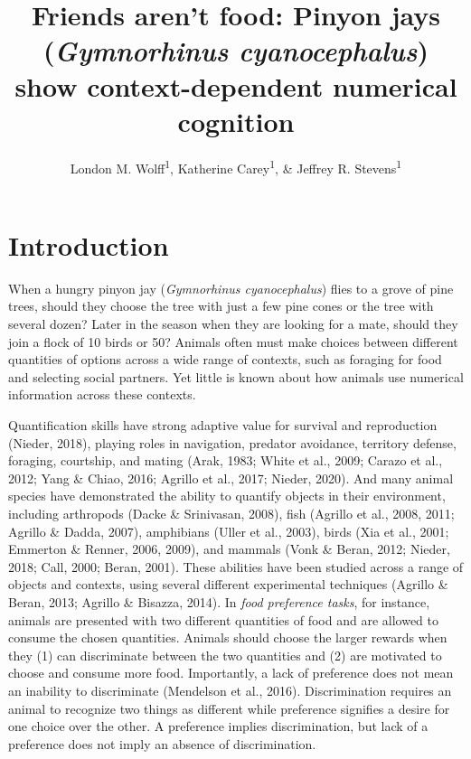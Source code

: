 \documentclass[
  ,pub,floatsintext]{apa6}
\title{Friends aren't food: Pinyon jays (\emph{Gymnorhinus cyanocephalus}) show context-dependent numerical cognition}
\author{London M. Wolff\textsuperscript{1}, Katherine Carey\textsuperscript{1}, \& Jeffrey R. Stevens\textsuperscript{1}}
\date{}
\affiliation{\vspace{0.5cm}\textsuperscript{1} Department of Psychology, Center for Brain, Biology \& Behavior, University of Nebraska-Lincoln, Lincoln, NE, USA}
\begin{document}
\maketitle

\hypertarget{introduction}{%
\section{Introduction}\label{introduction}}

When a hungry pinyon jay (\emph{Gymnorhinus cyanocephalus}) flies to a grove of pine trees, should they choose the tree with just a few pine cones or the tree with several dozen? Later in the season when they are looking for a mate, should they join a flock of 10 birds or 50? Animals often must make choices between different quantities of options across a wide range of contexts, such as foraging for food and selecting social partners. Yet little is known about how animals use numerical information across these contexts.

Quantification skills have strong adaptive value for survival and reproduction (Nieder, 2018), playing roles in navigation, predator avoidance, territory defense, foraging, courtship, and mating (Arak, 1983; White et al., 2009; Carazo et al., 2012; Yang \& Chiao, 2016; Agrillo et al., 2017; Nieder, 2020). And many animal species have demonstrated the ability to quantify objects in their environment, including arthropods (Dacke \& Srinivasan, 2008), fish (Agrillo et al., 2008, 2011; Agrillo \& Dadda, 2007), amphibians (Uller et al., 2003), birds (Xia et al., 2001; Emmerton \& Renner, 2006, 2009), and mammals (Vonk \& Beran, 2012; Nieder, 2018; Call, 2000; Beran, 2001). These abilities have been studied across a range of objects and contexts, using several different experimental techniques (Agrillo \& Beran, 2013; Agrillo \& Bisazza, 2014). In \emph{food preference tasks}, for instance, animals are presented with two different quantities of food and are allowed to consume the chosen quantities. Animals should choose the larger rewards when they (1) can discriminate between the two quantities and (2) are motivated to choose and consume more food. Importantly, a lack of preference does not mean an inability to discriminate (Mendelson et al., 2016). Discrimination requires an animal to recognize two things as different while preference signifies a desire for one choice over the other. A preference implies discrimination, but lack of a preference does not imply an absence of discrimination.
\end{document}
